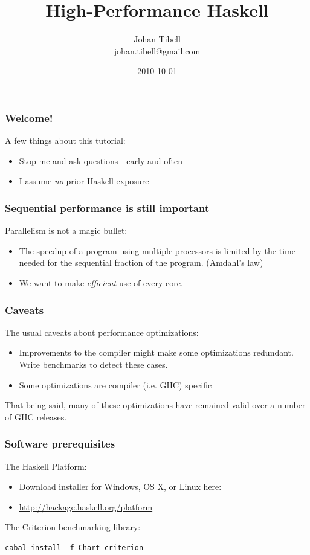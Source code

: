 \documentclass{beamer}
\title{High-Performance Haskell}
\author{Johan Tibell\\johan.tibell@gmail.com}
\date{2010-10-01}
\begin{document}
\lstset{language=Haskell}

\frame{\titlepage}

\begin{frame}
  \frametitle{Welcome!}

  A few things about this tutorial:
  \begin{itemize}
  \item Stop me and ask questions---early and often
  \item I assume \emph{no} prior Haskell exposure
  \end{itemize}
\end{frame}

\begin{frame}
  \frametitle{Sequential performance is still important}

  Parallelism is not a magic bullet:
  \begin{itemize}
  \item The speedup of a program using multiple processors is limited
    by the time needed for the sequential fraction of the
    program. (Amdahl's law)
  \item We want to make \emph{efficient} use of every core.
  \end{itemize}
\end{frame}

\begin{frame}
  \frametitle{Caveats}

  The usual caveats about performance optimizations:
  \begin{itemize}
  \item Improvements to the compiler might make some optimizations
    redundant.  Write benchmarks to detect these cases.
  \item Some optimizations are compiler (i.e. GHC) specific
  \end{itemize}
  That being said, many of these optimizations have remained valid
  over a number of GHC releases.
\end{frame}

\begin{frame}[fragile]
  \frametitle{Software prerequisites}

  The Haskell Platform:
  \begin{itemize}
  \item Download installer for Windows, OS X, or Linux here:
  \item \url{http://hackage.haskell.org/platform}
  \end{itemize}

  The Criterion benchmarking library:
  \begin{verbatim}
cabal install -f-Chart criterion
  \end{verbatim}
\end{frame}
\end{document}
